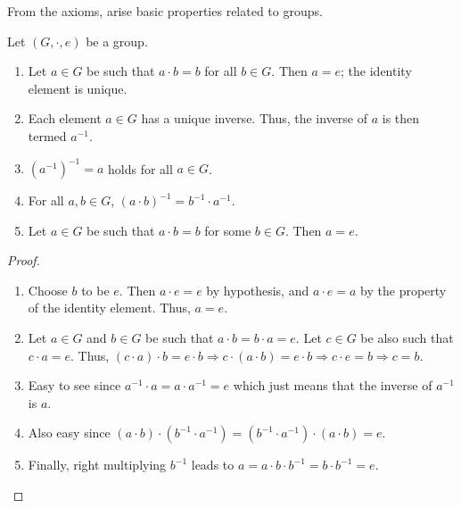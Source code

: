 From the axioms, arise basic properties related to groups.
\begin{proposition}
    Let $(G,\cdot,e)$ be a group.
    \begin{enumerate}
        \item Let $a \in G$ be such that $a \cdot b = b$ for all $b \in G$. Then $a = e$; the identity element is unique.
        \item Each element $a \in G$ has a unique inverse. Thus, the inverse of $a$ is then termed $a^{-1}$.
        \item $(a^{-1})^{-1} = a$ holds for all $a \in G$.
        \item For all $a,b \in G$, $(a \cdot b)^{-1} = b^{-1} \cdot a^{-1}$.
        \item  Let $a \in G$ be such that $a \cdot b = b$ for some $b \in G$. Then $a = e$.
    \end{enumerate}
\end{proposition}
\begin{proof}
    \begin{enumerate}
        \item Choose $b$ to be $e$. Then $a \cdot e = e$ by hypothesis, and $a \cdot e = a$ by the property of the identity element. Thus, $a = e$.
        
        \item Let $a \in G$ and $b \in G$ be such that $a \cdot b = b \cdot a = e$. Let $c \in G$ be also such that $c \cdot a = e$. Thus, $(c \cdot a) \cdot b = e \cdot b \Rightarrow c \cdot (a \cdot b) = e \cdot b \Rightarrow c \cdot e = b \Rightarrow c = b$.
        
        \item Easy to see since $a^{-1} \cdot a = a \cdot a^{-1} = e$ which just means that the inverse of $a^{-1}$ is $a$.
        
        \item Also easy since $(a \cdot b) \cdot (b^{-1} \cdot a^{-1}) = (b^{-1} \cdot a^{-1}) \cdot (a \cdot b) = e$.
        
        \item Finally, right multiplying $b^{-1}$ leads to $a = a \cdot b \cdot b^{-1} = b \cdot b^{-1} = e$.
    \end{enumerate}
\end{proof}